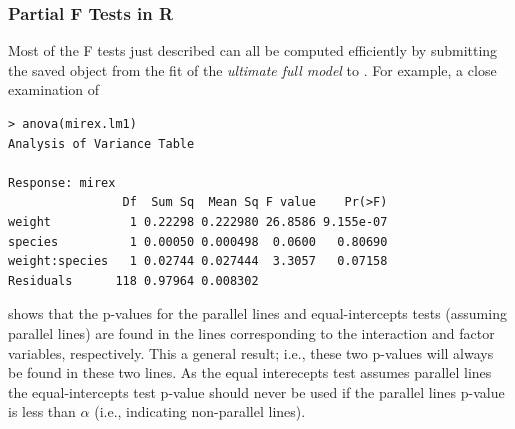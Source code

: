 \documentclass[10pt,openany]{book}\usepackage[]{graphicx}\usepackage[]{color}
\makeatletter
\newenvironment{kframe}{%
 \def\at@end@of@kframe{}%
 \ifinner\ifhmode%
  \def\at@end@of@kframe{\end{minipage}}%
  \begin{minipage}{\columnwidth}%
 \fi\fi%
 \def\FrameCommand##1{\hskip\@totalleftmargin \hskip-\fboxsep
 \colorbox{shadecolor}{##1}\hskip-\fboxsep
     \hskip-\linewidth \hskip-\@totalleftmargin \hskip\columnwidth}%
 \MakeFramed {\advance\hsize-\width
   \@totalleftmargin\z@ \linewidth\hsize
   \@setminipage}}%
 {\par\unskip\endMakeFramed%
 \at@end@of@kframe}
\newenvironment{knitrout}{}{} %
\makeatother
\begin{document}

\vspace{-12pt}

\subsubsection*{Partial F Tests in R}
Most of the F tests just described can all be computed efficiently by submitting the saved  object from the fit of the \emph{ultimate full model} to .  For example, a close examination of

\begin{knitrout}
\color{fgcolor}\begin{kframe}
\begin{verbatim}
> anova(mirex.lm1)
Analysis of Variance Table

Response: mirex
                Df  Sum Sq  Mean Sq F value    Pr(>F)
weight           1 0.22298 0.222980 26.8586 9.155e-07
species          1 0.00050 0.000498  0.0600   0.80690
weight:species   1 0.02744 0.027444  3.3057   0.07158
Residuals      118 0.97964 0.008302                  
\end{verbatim}
\end{kframe}
\end{knitrout}

shows that the p-values for the parallel lines and equal-intercepts tests (assuming parallel lines) are found in the lines corresponding to the interaction and factor variables, respectively.  This a general result; i.e., these two p-values will always be found in these two lines.  As the equal interecepts test assumes parallel lines the equal-intercepts test p-value should never be used if the parallel lines p-value is less than $\alpha$ (i.e., indicating non-parallel lines).


\vspace{-12pt}

\vspace{-12pt}
\end{document}
